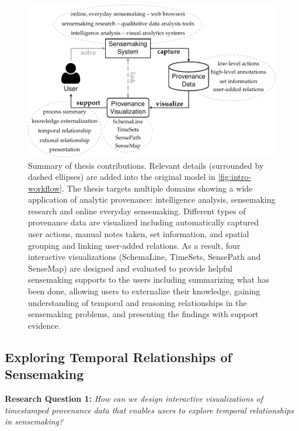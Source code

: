\begin{figure}
	\centering
	\includegraphics{contribution}
	\caption[Summary of thesis contributions]{Summary of thesis contributions. Relevant details (surrounded by dashed ellipses) are added into the original model in \autoref{fig:intro-workflow}. The thesis targets multiple domains showing a wide application of analytic provenance: intelligence analysis, sensemaking research and online everyday sensemaking. Different types of provenance data are visualized including automatically captured user actions, manual notes taken, set information, and spatial grouping and linking user-added relations. As a result, four interactive visualizations (SchemaLine, TimeSets, SensePath and SenseMap) are designed and evaluated to provide helpful sensemaking supports to the users including summarizing what has been done, allowing users to externalize their knowledge, gaining understanding of temporal and reasoning relationships in the sensemaking problems, and presenting the findings with support evidence.}
	\label{fig:con-contribution}
\end{figure}

\subsection{Exploring Temporal Relationships of Sensemaking}
\textbf{Research Question 1:} \emph{How can we design interactive visualizations of timestamped provenance data that enables users to explore temporal relationships in sensemaking?}


